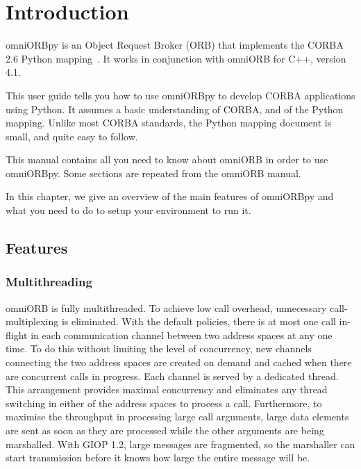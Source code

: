 \documentclass[11pt,twoside,a4paper]{book}
\begin{document}

\mainmatter

\chapter{Introduction}

omniORBpy is an Object Request Broker (ORB) that implements the CORBA
2.6 Python mapping~\cite{pythonmapping}. It works in conjunction with
omniORB for C++, version 4.1.

This user guide tells you how to use omniORBpy to develop CORBA
applications using Python. It assumes a basic understanding of CORBA,
and of the Python mapping. Unlike most CORBA standards, the Python
mapping document is small, and quite easy to follow.

This manual contains all you need to know about omniORB in order to
use omniORBpy. Some sections are repeated from the omniORB manual.

In this chapter, we give an overview of the main features of omniORBpy
and what you need to do to setup your environment to run it.

\section{Features}

\subsection{Multithreading}

omniORB is fully multithreaded. To achieve low call overhead,
unnecessary call-multiplexing is eliminated. With the default
policies, there is at most one call in-flight in each communication
channel between two address spaces at any one time. To do this without
limiting the level of concurrency, new channels connecting the two
address spaces are created on demand and cached when there are
concurrent calls in progress. Each channel is served by a dedicated
thread. This arrangement provides maximal concurrency and eliminates
any thread switching in either of the address spaces to process a
call. Furthermore, to maximise the throughput in processing large call
arguments, large data elements are sent as soon as they are processed
while the other arguments are being marshalled. With GIOP 1.2, large
messages are fragmented, so the marshaller can start transmission
before it knows how large the entire message will be.
\end{document}
